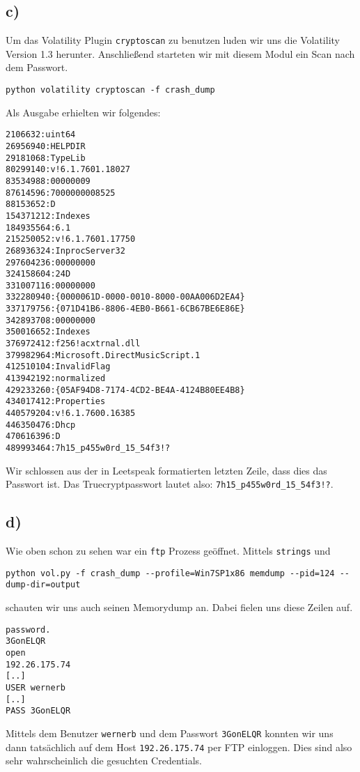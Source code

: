 \documentclass[10pt,a4paper]{article}
\begin{document}
\subsection*{c)}
Um das Volatility Plugin \texttt{cryptoscan} zu benutzen luden wir uns die Volatility Version 1.3 herunter. Anschließend starteten wir mit diesem Modul ein Scan nach dem Passwort.
\begin{verbatim}
python volatility cryptoscan -f crash_dump
\end{verbatim}
Als Ausgabe erhielten wir folgendes:
\begin{verbatim}
2106632:uint64
26956940:HELPDIR
29181068:TypeLib
80299140:v!6.1.7601.18027
83534988:00000009
87614596:7000000008525
88153652:D 
154371212:Indexes
184935564:6.1
215250052:v!6.1.7601.17750
268936324:InprocServer32
297604236:00000000
324158604:24D
331007116:00000000
332280940:{0000061D-0000-0010-8000-00AA006D2EA4}
337179756:{071D41B6-8806-4EB0-B661-6CB67BE6E86E}
342893708:00000000
350016652:Indexes
376972412:f256!acxtrnal.dll
379982964:Microsoft.DirectMusicScript.1
412510104:InvalidFlag
413942192:normalized
429233260:{05AF94D8-7174-4CD2-BE4A-4124B80EE4B8}
434017412:Properties
440579204:v!6.1.7600.16385
446350476:Dhcp
470616396:D 
489993464:7h15_p455w0rd_15_54f3!?
\end{verbatim}
Wir schlossen aus der in Leetspeak formatierten letzten Zeile, dass dies das Passwort ist.
Das Truecryptpasswort lautet also:
\texttt{7h15\_p455w0rd\_15\_54f3!?}.

\subsection*{d)}
Wie oben schon zu sehen war ein \texttt{ftp} Prozess geöffnet. Mittels \texttt{strings} und
\begin{verbatim}
python vol.py -f crash_dump --profile=Win7SP1x86 memdump --pid=124 --dump-dir=output
\end{verbatim}
schauten wir uns auch seinen Memorydump an. Dabei fielen uns diese Zeilen auf.
\begin{verbatim}
password.
3GonELQR
open
192.26.175.74
[..]
USER wernerb
[..]
PASS 3GonELQR
\end{verbatim}
Mittels dem Benutzer \texttt{wernerb} und dem Passwort \texttt{3GonELQR} konnten wir uns dann tatsächlich auf dem Host \texttt{192.26.175.74} per FTP einloggen. Dies sind also sehr wahrscheinlich die gesuchten Credentials.
\end{document}
